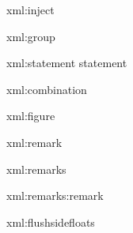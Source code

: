 \startxmlsetups xml:inject
%
\stopxmlsetups

\startxmlsetups xml:group
%
\stopxmlsetups

\startxmlsetups xml:statement
statement
%
\stopxmlsetups

\startxmlsetups xml:combination
%
\stopxmlsetups

\iffalse
\startxmlsetups xml:exercise
\ctxlua{L.processExercise("#1")}%
\stopxmlsetups
\fi

\startxmlsetups xml:figure
%
\stopxmlsetups

\iffalse
\startxmlsetups xml:proof
\ctxlua{L.processProof("#1")}%
\stopxmlsetups
\fi

\startxmlsetups xml:remark
%
\stopxmlsetups

\startxmlsetups xml:remarks 
{\tenpoint{}%
%
\stopitemize}%
\stopxmlsetups

\startxmlsetups xml:remarks:remark
\item{}%
\stopxmlsetups

\iffalse
\startxmlsetups xml:text

\ctxlua{L.processRawContent("#1")}%
\stopxmlsetups
\fi

\iffalse
\startxmlsetups xml:uses
{\tenpoint
\startitemize[packed,intext,joinedup,4,nowhite,after]
\xmlflush{#1}%
\stopitemize}
\stopxmlsetups


\startxmlsetups xml:item
\ctxlua{L.processContent("#1","\\item")}%
\stopxmlsetups
\fi

\startxmlsetups xml:flushsidefloats
\flushsidefloats
\stopxmlsetups

\def\setupCourse#1{\ctxlua{L.setCourse("#1")}}
\def\completeRecords{\ctxlua{L.showRecords()}}%

\protect
\stopenvironment
